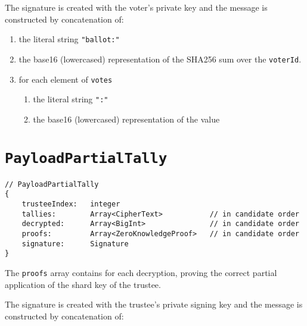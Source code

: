 The signature is created with the voter's private key and the message is constructed by concatenation of:

\begin{enumerate}
    \item the literal string \lstinline[style=ES6]{"ballot:"}
    \item the base16 (lowercased) representation of the SHA256 sum over the \texttt{voterId}.
    \item for each element of \texttt{votes}
          \begin{enumerate}
              \item the literal string \lstinline[style=ES6]{":"}
              \item the base16 (lowercased) representation of the value
          \end{enumerate}
\end{enumerate}

\section*{\texttt{PayloadPartialTally}}
\label{dt:payload:tally}
\begin{lstlisting}[style=ES6]
// PayloadPartialTally
{
    trusteeIndex:   integer
    tallies:        Array<CipherText>           // in candidate order
    decrypted:      Array<BigInt>               // in candidate order
    proofs:         Array<ZeroKnowledgeProof>   // in candidate order
    signature:      Signature
}
\end{lstlisting}

The \texttt{proofs} array contains  for each decryption, proving the correct partial application of the shard key of the trustee.

The signature is created with the trustee's private signing key and the message is constructed by concatenation of:

